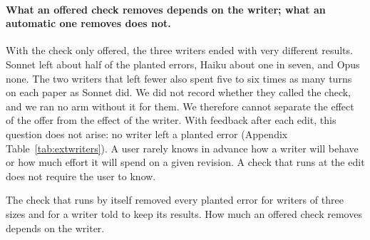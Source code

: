 \paragraph{What an offered check removes depends on the writer; what an automatic one removes does not.}
With the check only offered, the three writers ended with very different results. Sonnet left about half of the
planted errors, Haiku about one in seven, and Opus none. The two writers that left fewer also spent five to six times
as many turns on each paper as Sonnet did. We did not record whether they called the check, and we ran no arm without
it for them. We therefore cannot separate the effect of the offer from the effect of the writer. With feedback after
each edit, this question does not arise: no writer left a planted error (Appendix Table~\ref{tab:extwriters}). A user
rarely knows in advance how a writer will behave or how much effort it will spend on a given revision. A check that
runs at the edit does not require the user to know.

\begin{finding}
The check that runs by itself removed every planted error for writers of three sizes and for a writer told to keep
its results. How much an offered check removes depends on the writer.
\end{finding}

